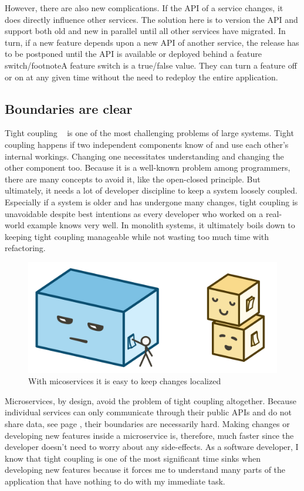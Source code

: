 However, there are also new complications. If the API of a service changes, it does directly influence other services. The solution here is to version the API and support both old and new in parallel until all other services have migrated. In turn, if a new feature depends upon a new API of another service, the release has to be postponed until the API is available or deployed behind a feature switch/footnote{A feature switch is a true/false value. They can turn a feature off or on at any given time without the need to redeploy the entire application}.


\subsection{Boundaries are clear}

Tight coupling ~\cite{kaye.2003} is one of the most challenging problems of large systems. Tight coupling happens if two independent components know of and use each other's internal workings. Changing one necessitates understanding and changing the other component too. Because it is a well-known problem among programmers, there are many concepts to avoid it, like the open-closed principle. But ultimately, it needs a lot of developer discipline to keep a system loosely coupled. Especially if a system is older and has undergone many changes, tight coupling is unavoidable despite best intentions as every developer who worked on a real-world example knows very well. In monolith systems, it ultimately boils down to keeping tight coupling manageable while not wasting too much time with refactoring.

\begin{figure}[ht]
  \centering
  \includegraphics[width=0.55\linewidth]{assets/illustration-setting.png}
  \caption{With micoservices it is easy to keep changes localized}
\end{figure}

Microservices, by design, avoid the problem of tight coupling altogether. Because individual services can only communicate through their public APIs and do not share data, see page \pageref{sec:theory:decentralized-data}, their boundaries are necessarily hard. Making changes or developing new features inside a microservice is, therefore, much faster since the developer doesn't need to worry about any side-effects. As a software developer, I know that tight coupling is one of the most significant time sinks when developing new features because it forces me to understand many parts of the application that have nothing to do with my immediate task.


